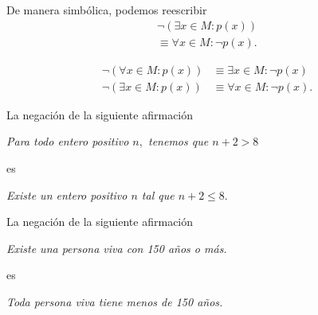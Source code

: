 \documentclass[xcolor={svgnames},
  hyperref={colorlinks}, 
  spanish, 12pt]{beamer}
\numberwithin{equation}{section} %
\numberwithin{figure}{section} %
\begin{document}
\begin{frame}
 De manera simb\'olica, podemos reescribir
  \begin{align*}
  \neg\left( \exists x\in M: p(x) \right)\\ \equiv \forall x\in M: \neg p(x).
\end{align*}
\end{frame}

\begin{frame}
 \begin{thm}[DeMorgan]
  \begin{align}
  \label{lip:thm:4.4}
   \neg\left( \forall x\in M: p(x) \right)& \equiv \exists x\in M: \neg p(x)\\
   \label{lip:thm:4.5}
   \neg\left( \exists x\in M: p(x) \right)& \equiv \forall x\in M: \neg p(x).
  \end{align}

 \end{thm}

\end{frame}

\begin{frame}
 \begin{exmp}
  \label{lip:exmp:4.10.a}
  La negaci\'on de la siguiente afirmaci\'on
  \begin{center}
   \emph{Para todo entero positivo $n,$ tenemos que $n+2>8$}
  \end{center}
es 
\begin{center}
 \emph{Existe un entero positivo $n$ tal que $n+2 \leq 8.$}
\end{center}

 \end{exmp}

\end{frame}

\begin{frame}
 \begin{exmp}
  \label{lip:exmp:4.10.b}
  La negaci\'on de la siguiente afirmaci\'on
  \begin{center}
   \emph{Existe una persona viva con 150 a\~nos o m\'as.}
  \end{center}
 es 
 \begin{center}
  \emph{Toda persona viva tiene menos de 150 a\~nos.}
 \end{center}

 \end{exmp}

\end{frame}
\end{document}
